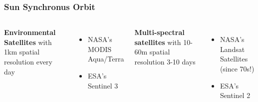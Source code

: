 \begin{frame}
	\frametitle{Sun Synchronus Orbit}
	\begin{columns}
		
		
		\textbf{Environmental Satellites} with 1km spatial resolution every day
		\begin{itemize}
			\item NASA's MODIS Aqua/Terra
			\item ESA's Sentinel 3
		\end{itemize}
		\vspace{2em}
		 
		\textbf{Multi-spectral satellites} with 10-60m spatial resolution 3-10 days
		\begin{itemize}
			\item NASA's Landsat Satellites (since 70s!)
			\item ESA's Sentinel 2
		\end{itemize}
		 
		
		
\end{columns}
\end{frame}
